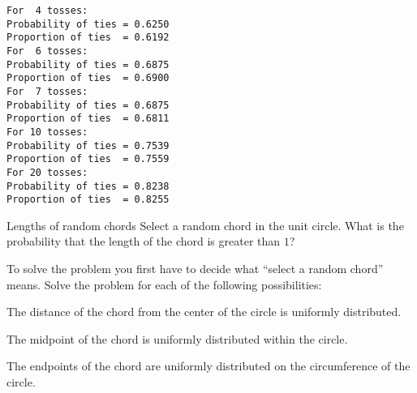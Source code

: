 \sml{}
\begin{verbatim}
For  4 tosses:
Probability of ties = 0.6250
Proportion of ties  = 0.6192
For  6 tosses:
Probability of ties = 0.6875
Proportion of ties  = 0.6900
For  7 tosses:
Probability of ties = 0.6875
Proportion of ties  = 0.6811
For 10 tosses:
Probability of ties = 0.7539
Proportion of ties  = 0.7559
For 20 tosses:
Probability of ties = 0.8238
Proportion of ties  = 0.8255
\end{verbatim}






\begin{prob}{Lengths of random chords}
Select a random chord in the unit circle. What is the probability that the length of the chord is greater than $1$?

To solve the problem you first have to decide what ``select a random chord'' means. Solve the problem for each of the following possibilities:

 The distance of the chord from the center of the circle is uniformly distributed.

 The midpoint of the chord is uniformly distributed within the circle.

 The endpoints of the chord are uniformly distributed on the circumference of the circle.
\end{prob}

\solution{}


